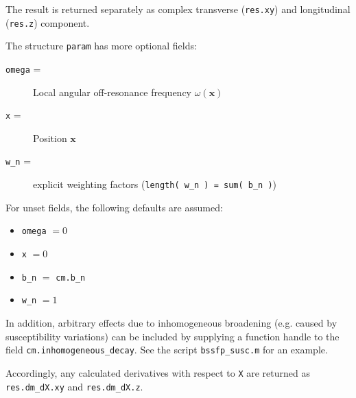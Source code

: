 \documentclass[a4paper,10pt]{article}
\begin{document}
The result is returned separately as complex transverse (\texttt{res.xy}) and longitudinal (\texttt{res.z}) component.

The structure \texttt{param} has more optional fields:

\begin{description}
\item[{\texttt{omega} =}] Local angular off-resonance frequency \(\omega\left(\bm{x}\right)\)
\item[{\texttt{x} =}] Position \(\bm{x}\)
\item[{\texttt{w\_n} =}] explicit weighting factors (\texttt{length( w\_n ) = sum( b\_n )})
\end{description}

For unset fields, the following defaults are assumed:

\begin{itemize}
\item \texttt{omega} \(= 0\)
\item \texttt{x} \(= 0\)
\item \texttt{b\_n} \(=\) \texttt{cm.b\_n}
\item \texttt{w\_n} \(= 1\)
\end{itemize}

In addition, arbitrary effects due to inhomogeneous broadening (e.g. caused by susceptibility variations) can be included by 
supplying a function handle to the field \texttt{cm.inhomogeneous\_decay}. See the script \texttt{bssfp\_susc.m} for an example. 

Accordingly, any calculated derivatives with respect to \texttt{X} are returned as \texttt{res.dm\_dX.xy} and \texttt{res.dm\_dX.z}. 
\end{document}
